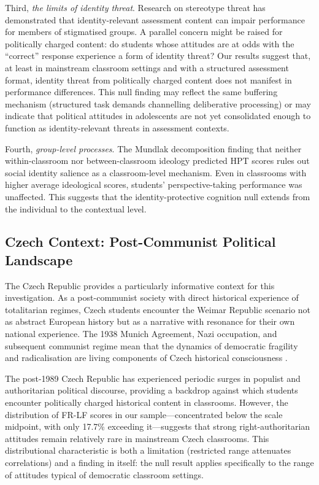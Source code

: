 \documentclass[referee,pdflatex,sn-apa]{sn-jnl}
\begin{document}
Third, \textit{the limits of identity threat}. Research on stereotype threat \citep{Steele1997} has demonstrated that identity-relevant assessment content can impair performance for members of stigmatised groups. A parallel concern might be raised for politically charged content: do students whose attitudes are at odds with the ``correct'' response experience a form of identity threat? Our results suggest that, at least in mainstream classroom settings and with a structured assessment format, identity threat from politically charged content does not manifest in performance differences. This null finding may reflect the same buffering mechanism (structured task demands channelling deliberative processing) or may indicate that political attitudes in adolescents are not yet consolidated enough to function as identity-relevant threats in assessment contexts.

Fourth, \textit{group-level processes}. The Mundlak decomposition finding that neither within-classroom nor between-classroom ideology predicted HPT scores rules out social identity salience as a classroom-level mechanism. Even in classrooms with higher average ideological scores, students' perspective-taking performance was unaffected. This suggests that the identity-protective cognition null extends from the individual to the contextual level.

\subsection{Czech Context: Post-Communist Political Landscape}\label{subsec:czech}

The Czech Republic provides a particularly informative context for this investigation. As a post-communist society with direct historical experience of totalitarian regimes, Czech students encounter the Weimar Republic scenario not as abstract European history but as a narrative with resonance for their own national experience. The 1938 Munich Agreement, Nazi occupation, and subsequent communist regime mean that the dynamics of democratic fragility and radicalisation are living components of Czech historical consciousness \citep{Cinatl2021,Ripka2024,Munich2023}.

The post-1989 Czech Republic has experienced periodic surges in populist and authoritarian political discourse, providing a backdrop against which students encounter politically charged historical content in classrooms. However, the distribution of FR-LF scores in our sample---concentrated below the scale midpoint, with only 17.7\% exceeding it---suggests that strong right-authoritarian attitudes remain relatively rare in mainstream Czech classrooms. This distributional characteristic is both a limitation (restricted range attenuates correlations) and a finding in itself: the null result applies specifically to the range of attitudes typical of democratic classroom settings.
\end{document}
